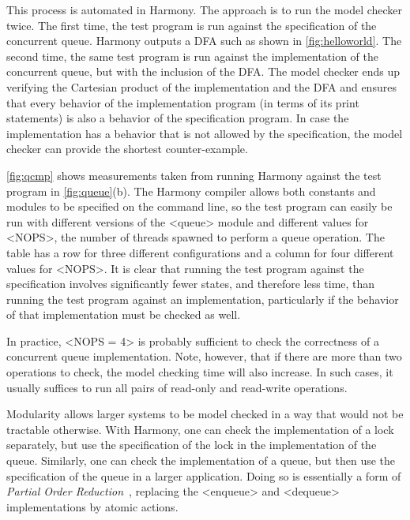 \documentclass[twocolumn]{article}
\begin{document}
This process is automated in Harmony.  The approach is to
run the model checker twice.  The first time, the test program is
run against the specification of the concurrent queue.  Harmony
outputs a DFA such as shown in \autoref{fig:helloworld}.  The second
time, the same test program is run against the implementation of the
concurrent queue, but with the inclusion of the DFA.  The model
checker ends up verifying the Cartesian product of the implementation
and the DFA and ensures that every behavior of the implementation
program (in terms of its print statements) is also a behavior of
the specification program.  In case the implementation has a behavior
that is not allowed by the specification, the model checker can
provide the shortest counter-example.

\autoref{fig:qcmp} shows measurements taken from running
Harmony against the test program in \autoref{fig:queue}(b).
The Harmony compiler allows both constants and modules to be
specified on the command line, so the test program can easily be
run with different versions of the <{queue}> module and different
values for <{NOPS}>, the number of threads spawned to
perform a queue operation.  The table has a row for three different
configurations and a column for four different values for <{NOPS}>.
It is clear that running the test program against the specification
involves significantly fewer states, and therefore less time, than
running the test program against an implementation, particularly
if the behavior of that implementation must be checked as well.

In practice, <{NOPS = 4}> is probably sufficient to check the
correctness of a concurrent queue implementation.  Note, however,
that if there are more than two operations to check, the model
checking time will also increase.  In such cases, it usually suffices
to run all pairs of read-only and read-write operations.

Modularity allows larger systems to be model checked in a way
that would not be tractable otherwise.
With Harmony, one can check the implementation of a lock separately,
but use the specification of the lock in the implementation of the
queue.  Similarly, one can check the implementation of a queue,
but then use the specification of the queue in a larger application.
Doing so is essentially a form of \emph{Partial Order Reduction}~\cite{Val91},
replacing the <{enqueue}> and <{dequeue}> implementations
by atomic actions.
\end{document}
